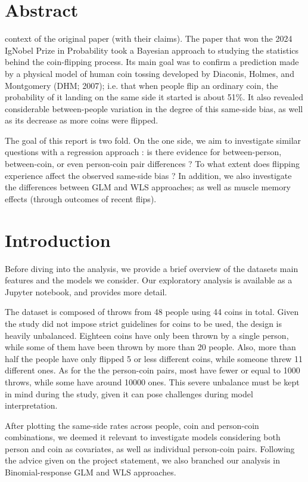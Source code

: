\documentclass[a4paper, 12pt,oneside]{article}
\begin{document}
 
	 
	\clearpage
	\tableofcontents
	\thispagestyle{empty}
	\clearpage
	\setcounter{page}{1}
	\section*{Abstract}
		context of the original paper (with their claims). The paper that won the 2024 IgNobel Prize in Probability took a Bayesian approach to studying the statistics behind the coin-flipping process. Its main goal was to confirm a prediction made by a physical model of human coin tossing developed by Diaconis, Holmes, and Montgomery (DHM; 2007); i.e. that when people flip an ordinary coin, the probability of it landing on the same side it started is about 51\%. 
		It also revealed considerable between-people variation in the degree of this same-side bias, as well as its decrease as more coins were flipped. 

		The goal of this report is two fold. On the one side, we aim to investigate similar questions with a regression approach : 
		is there evidence for between-person, between-coin, or even person-coin pair differences ? To what extent does flipping experience affect the observed same-side bias ?
		In addition, we also investigate the differences between GLM and WLS approaches; as well as muscle memory effects (through outcomes of recent flips). 
	\section{Introduction}
		Before diving into the analysis, we provide a brief overview of the datasets main features and the models we consider. Our exploratory analysis is available as a Jupyter notebook, and provides more detail. 

		The dataset is composed of throws from 48 people using 44 coins in total. Given the study did not impose strict guidelines for coins to be used, the design is heavily unbalanced. Eighteen coins have only been thrown by a single person, while some of them have been thrown by more than 20 people. Also, more than half the people have only flipped 5 or less different coins, while someone threw 11 different ones. As for the the person-coin pairs, most have fewer or equal to 1000 throws, while some have around 10000 ones. This severe unbalance must be kept in mind during the study, given it can pose challenges during model interpretation. 

		After plotting the same-side rates across people, coin and person-coin combinations, we deemed it relevant to investigate models considering both person and coin as covariates, as well as individual person-coin pairs. Following the advice given on the project statement, we also branched our analysis in Binomial-response GLM and WLS approaches. 
\end{document}
